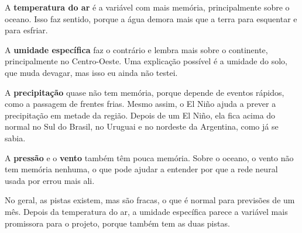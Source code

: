 \documentclass[11pt,a4paper]{article}
\begin{document}
A \textbf{temperatura do ar} é a variável com mais memória, principalmente sobre o oceano. Isso faz sentido, porque a água demora mais que a terra para esquentar e para esfriar.

A \textbf{umidade específica} faz o contrário e lembra mais sobre o continente, principalmente no Centro-Oeste. Uma explicação possível é a umidade do solo, que muda devagar, mas isso eu ainda não testei.

A \textbf{precipitação} quase não tem memória, porque depende de eventos rápidos, como a passagem de frentes frias. Mesmo assim, o El Niño ajuda a prever a precipitação em metade da região. Depois de um El Niño, ela fica acima do normal no Sul do Brasil, no Uruguai e no nordeste da Argentina, como já se sabia.

A \textbf{pressão} e o \textbf{vento} também têm pouca memória. Sobre o oceano, o vento não tem memória nenhuma, o que pode ajudar a entender por que a rede neural usada por  errou mais ali.

No geral, as pistas existem, mas são fracas, o que é normal para previsões de um mês. Depois da temperatura do ar, a umidade específica parece a variável mais promissora para o projeto, porque também tem as duas pistas.


\end{document}
